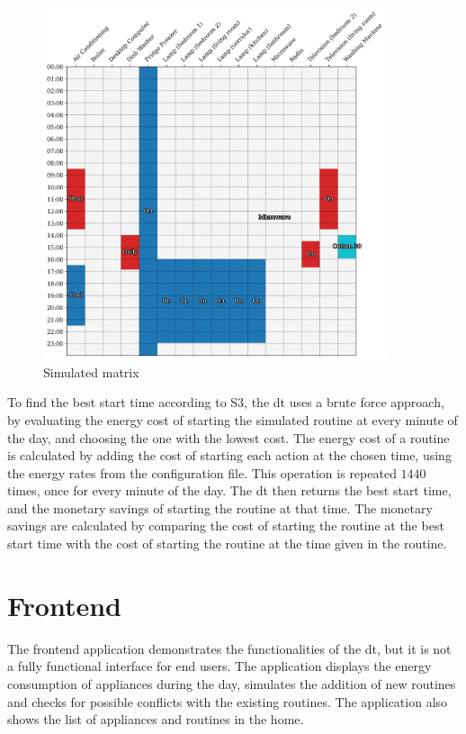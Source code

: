 \begin{figure}
    \centering
    \includegraphics[width=0.9\textwidth]{images/simulated_matrix.png}
    \caption{Simulated matrix}
    \label{fig:simulated_consumption_matrix}
\end{figure}

To find the best start time according to S3, the \acrshort{dt} uses a brute force approach, by evaluating the energy cost of starting the simulated routine at every minute of the day, and choosing the one with the lowest cost. The energy cost of a routine is calculated by adding the cost of starting each action at the chosen time, using the energy rates from the configuration file. This operation is repeated $1440$ times, once for every minute of the day. The \acrshort{dt} then returns the best start time, and the monetary savings of starting the routine at that time. The monetary savings are calculated by comparing the cost of starting the routine at the best start time with the cost of starting the routine at the time given in the routine.

\section{Frontend}

The frontend application demonstrates the functionalities of the \acrshort{dt}, but it is not a fully functional interface for end users. The application displays the energy consumption of appliances during the day, simulates the addition of new routines and checks for possible conflicts with the existing routines. The application also shows the list of appliances and routines in the home.

